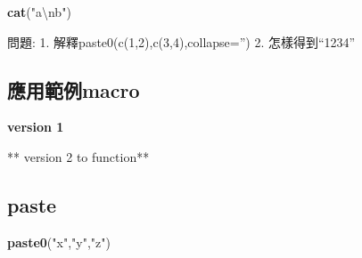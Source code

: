 \documentclass[]{book}
\newenvironment{Shaded}{\begin{snugshade}}{\end{snugshade}}
\newcommand{\KeywordTok}[1]{\textcolor[rgb]{0.13,0.29,0.53}{\textbf{#1}}}
\newcommand{\CharTok}[1]{\textcolor[rgb]{0.31,0.60,0.02}{#1}}
\newcommand{\StringTok}[1]{\textcolor[rgb]{0.31,0.60,0.02}{#1}}
\newcommand{\ControlFlowTok}[1]{\textcolor[rgb]{0.13,0.29,0.53}{\textbf{#1}}}
\newcommand{\NormalTok}[1]{#1}
\theoremstyle{definition}
\theoremstyle{definition}
\theoremstyle{definition}
\theoremstyle{remark}
\begin{document}
\begin{Shaded}
\begin{Highlighting}[]
\KeywordTok{cat}\NormalTok{(}\StringTok{"a}\CharTok{\textbackslash{}n}\StringTok{b"}\NormalTok{)}
\end{Highlighting}
\end{Shaded}

問題: 1. 解釋paste0(c(1,2),c(3,4),collapse='') 2. 怎樣得到``1234''

\subsection{應用範例macro}\label{macro}

\textbf{version 1}

\begin{Shaded}
\end{Shaded}

** version 2 to function**

\begin{Shaded}
\end{Shaded}

\subsection{paste}\label{paste}

\begin{Shaded}
\begin{Highlighting}[]
\KeywordTok{paste0}\NormalTok{(}\StringTok{"x"}\NormalTok{,}\StringTok{"y"}\NormalTok{,}\StringTok{"z"}\NormalTok{)}
\end{Highlighting}
\end{Shaded}
\end{document}
